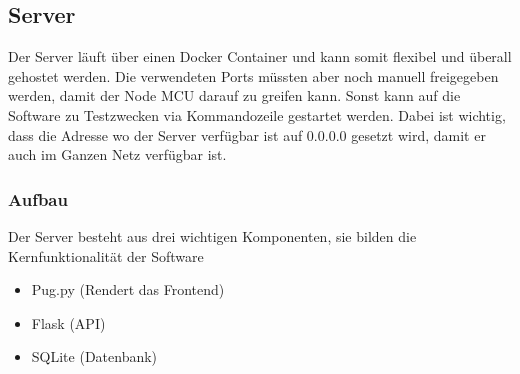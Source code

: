 \documentclass[../main.tex]{subfiles}
\begin{document}
\subsection{Server}

Der Server läuft über einen Docker Container und kann somit flexibel und überall gehostet werden. Die verwendeten Ports müssten aber noch manuell freigegeben werden, damit der Node MCU darauf zu greifen kann. Sonst kann auf die Software zu Testzwecken via Kommandozeile gestartet werden. Dabei ist wichtig, dass die Adresse wo der Server verfügbar ist auf 0.0.0.0 gesetzt wird, damit er auch im Ganzen Netz verfügbar ist.

\subsubsection{Aufbau}

Der Server besteht aus drei wichtigen Komponenten, sie bilden die Kernfunktionalität der Software

\begin{itemize}
    \item Pug.py (Rendert das Frontend)
    \item Flask (API)
    \item SQLite (Datenbank)
\end{itemize}
\end{document}

